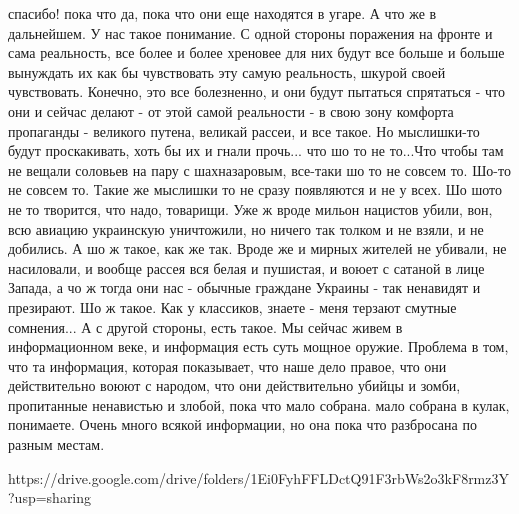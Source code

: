 спасибо! пока что да, пока что они еще находятся в угаре. А что же в
дальнейшем. У нас такое понимание. С одной стороны поражения на фронте и сама
реальность, все более и более хреновее для них будут все больше и больше
вынуждать их как бы чувствовать эту самую реальность, шкурой своей
чувствовать. Конечно, это все болезненно, и они будут пытаться спрятаться -
что они и сейчас делают - от этой самой реальности - в свою зону комфорта
пропаганды - великого путена, великай рассеи, и все такое. Но мыслишки-то
будут проскакивать, хоть бы их и гнали прочь... что шо то не то...Что чтобы
там не вещали соловьев на пару с шахназаровым, все-таки шо то не совсем то.
Шо-то не совсем то. Такие же мыслишки то не сразу появляются и не у всех. Шо
шото не то творится, что надо, товарищи. Уже ж вроде мильон нацистов убили,
вон, всю авиацию украинскую уничтожили, но ничего так толком и не взяли, и не
добились. А шо ж такое, как же так. Вроде же и мирных жителей не убивали, не
насиловали, и вообще рассея вся белая и пушистая, и воюет с сатаной в лице
Запада, а чо ж тогда они нас - обычные граждане Украины - так ненавидят и
презирают. Шо ж такое. Как у классиков, знаете - меня терзают смутные
сомнения... А с другой стороны, есть такое. Мы сейчас живем в информационном
веке, и информация есть суть мощное оружие. Проблема в том, что та информация,
которая показывает, что наше дело правое, что они действительно воюют с
народом, что они действительно убийцы и зомби, пропитанные ненавистью и
злобой, пока что мало собрана. мало собрана в кулак, понимаете. Очень много
всякой информации, но она пока что разбросана по разным местам. 

https://drive.google.com/drive/folders/1Ei0FyhFFLDctQ91F3rbWs2o3kF8rmz3Y?usp=sharing
